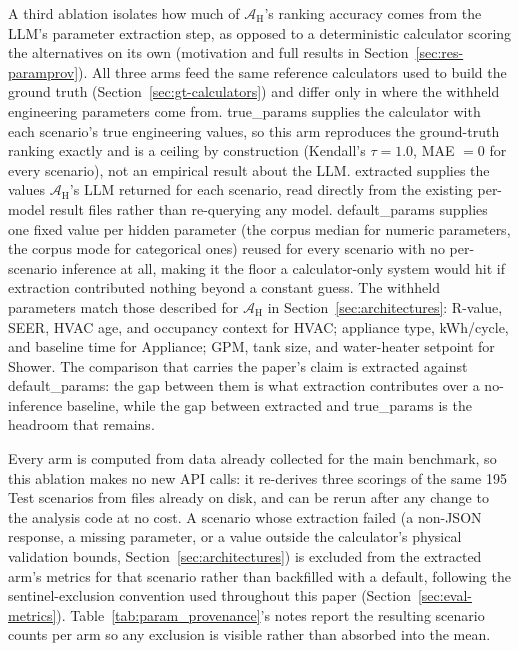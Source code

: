 \documentclass[a4paper,fleqn]{cas-dc}
\begin{document}
A third ablation isolates how much of $\mathcal{A}_{\text{H}}$'s ranking accuracy comes from the LLM's parameter extraction step, as opposed to a deterministic calculator scoring the alternatives on its own (motivation and full results in Section~\ref{sec:res-paramprov}). All three arms feed the same reference calculators used to build the ground truth (Section~\ref{sec:gt-calculators}) and differ only in where the withheld engineering parameters come from. true\_params supplies the calculator with each scenario's true engineering values, so this arm reproduces the ground-truth ranking exactly and is a ceiling by construction (Kendall's $\tau=1.0$, MAE $=0$ for every scenario), not an empirical result about the LLM. extracted supplies the values $\mathcal{A}_{\text{H}}$'s LLM returned for each scenario, read directly from the existing per-model result files rather than re-querying any model. default\_params supplies one fixed value per hidden parameter (the corpus median for numeric parameters, the corpus mode for categorical ones) reused for every scenario with no per-scenario inference at all, making it the floor a calculator-only system would hit if extraction contributed nothing beyond a constant guess. The withheld parameters match those described for $\mathcal{A}_{\text{H}}$ in Section~\ref{sec:architectures}: R-value, SEER, HVAC age, and occupancy context for HVAC; appliance type, kWh/cycle, and baseline time for Appliance; GPM, tank size, and water-heater setpoint for Shower. The comparison that carries the paper's claim is extracted against default\_params: the gap between them is what extraction contributes over a no-inference baseline, while the gap between extracted and true\_params is the headroom that remains.

Every arm is computed from data already collected for the main benchmark, so this ablation makes no new API calls: it re-derives three scorings of the same 195 Test scenarios from files already on disk, and can be rerun after any change to the analysis code at no cost. A scenario whose extraction failed (a non-JSON response, a missing parameter, or a value outside the calculator's physical validation bounds, Section~\ref{sec:architectures}) is excluded from the extracted arm's metrics for that scenario rather than backfilled with a default, following the sentinel-exclusion convention used throughout this paper (Section~\ref{sec:eval-metrics}). Table~\ref{tab:param_provenance}'s notes report the resulting scenario counts per arm so any exclusion is visible rather than absorbed into the mean.
\end{document}
